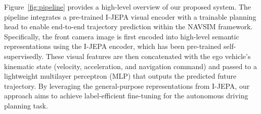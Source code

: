 \documentclass{article}
\begin{document}
Figure~\ref{fig:pipeline} provides a high-level overview of our proposed system. The pipeline integrates a pre-trained I-JEPA visual encoder with a trainable planning head to enable end-to-end trajectory prediction within the NAVSIM framework. Specifically, the front camera image is first encoded into high-level semantic representations using the I-JEPA encoder, which has been pre-trained self-supervisedly. These visual features are then concatenated with the ego vehicle’s kinematic state (velocity, acceleration, and navigation command) and passed to a lightweight multilayer perceptron (MLP) that outputs the predicted future trajectory. By leveraging the general-purpose representations from I-JEPA, our approach aims to achieve label-efficient fine-tuning for the autonomous driving planning task.



\end{document}
